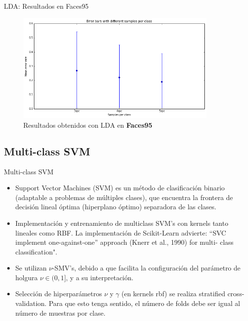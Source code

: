 \documentclass{beamer}
\begin{document}
\begin{frame}{LDA: Resultados en Faces95}
\begin{figure}[htpb!]
\centering
\includegraphics[width=10cm]{lda_res95}
\caption{Resultados obtenidos con LDA en \textbf{Faces95}}
\end{figure}
\end{frame}

\subsection{Multi-class SVM}

\begin{frame}{Multi-class SVM}
\begin{itemize}
	\item Support Vector Machines (SVM) es un método de clasificación binario (adaptable a problemas de múltiples clases), que encuentra la frontera de decisión lineal óptima (hiperplano óptimo) separadora de las clases.
	\item Implementación y entrenamiento de multiclass SVM's con kernels tanto lineales como RBF. La implementación de Scikit-Learn advierte: “SVC implement one-against-one” approach (Knerr et al., 1990) for multi- class classification".
	\item Se utilizan $\nu$-SMV's, debido a que facilita la configuración del parámetro de holgura $\nu \in (0,1]$, y a su interpretación.
	\item Selección de hiperparámetros $\nu$ y $\gamma$ (en kernels rbf) se realiza stratified cross-validation. Para que esto tenga sentido, el número de folds debe ser igual al número de muestras por clase.
\end{itemize}
\end{frame}
\end{document}
